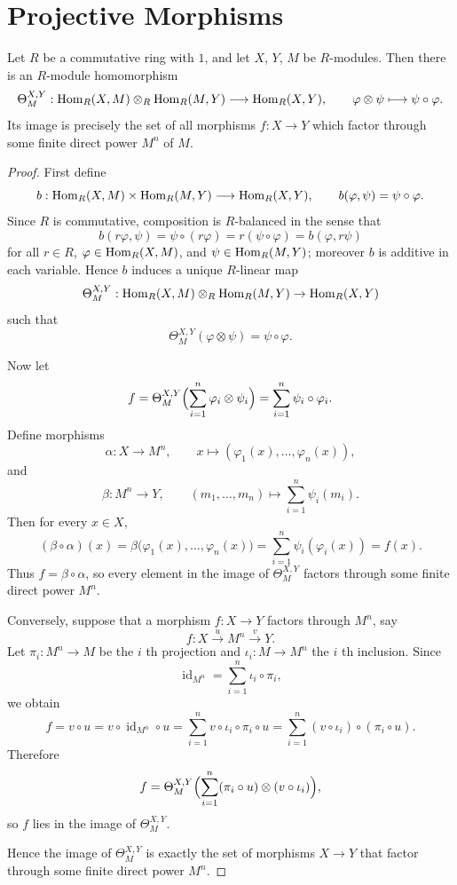 \section{Projective Morphisms}

\begin{lemma}
    Let $R$ be a commutative ring with $1$, and let $X$, $Y$, $M$ be $R$-modules. Then
    there is an $R$-module homomorphism
    \[
        \Theta_M^{X,Y}:\mathrm{Hom}_R(X,M)\otimes_R \mathrm{Hom}_R(M,Y)\longrightarrow \mathrm{Hom}_R(X,Y),
        \qquad
        \varphi\otimes \psi \longmapsto \psi\circ \varphi.
    \]
    Its image is precisely the set of all morphisms $f:X\to Y$ which factor through some
    finite direct power $M^n$ of $M$.
\end{lemma}

\begin{proof}
    First define
    \[
        b:\mathrm{Hom}_R(X,M)\times \mathrm{Hom}_R(M,Y)\longrightarrow \mathrm{Hom}_R(X,Y),
        \qquad
        b(\varphi,\psi)=\psi\circ\varphi.
    \]
    Since $R$ is commutative, composition is $R$-balanced in the sense that
    \[
        b(r\varphi,\psi)=\psi\circ(r\varphi)=r(\psi\circ\varphi)=b(\varphi,r\psi)
    \]
    for all $r\in R$, $\varphi\in\mathrm{Hom}_R(X,M)$, and $\psi\in\mathrm{Hom}_R(M,Y)$; moreover $b$ is additive in each variable. Hence $b$ induces a unique $R$-linear map
    \[
        \Theta_M^{X,Y}:\mathrm{Hom}_R(X,M)\otimes_R \mathrm{Hom}_R(M,Y)\to \mathrm{Hom}_R(X,Y)
    \]
    such that
    \[
        \Theta_M^{X,Y}(\varphi\otimes\psi)=\psi\circ\varphi.
    \]

    Now let
    \[
        f=\Theta_M^{X,Y}\Bigl(\sum_{i=1}^n \varphi_i\otimes\psi_i\Bigr)
        =\sum_{i=1}^n \psi_i\circ\varphi_i.
    \]
    Define morphisms
    \[
        \alpha:X\to M^n,\qquad x\longmapsto (\varphi_1(x),\dots,\varphi_n(x)),
    \]
    and
    \[
        \beta:M^n\to Y,\qquad (m_1,\dots,m_n)\longmapsto \sum_{i=1}^n \psi_i(m_i).
    \]
    Then for every $x\in X$,
    \[
        (\beta\circ\alpha)(x)
        =\beta\bigl(\varphi_1(x),\dots,\varphi_n(x)\bigr)
        =\sum_{i=1}^n \psi_i(\varphi_i(x))
        =f(x).
    \]
    Thus $f=\beta\circ\alpha$, so every element in the image of $\Theta_M^{X,Y}$ factors
    through some finite direct power $M^n$.

    Conversely, suppose that a morphism $f:X\to Y$ factors through $M^n$, say
    \[
        f:X\xrightarrow{\,u\,} M^n \xrightarrow{\,v\,} Y.
    \]
    Let $\pi_i:M^n\to M$ be the $i$ th projection and $\iota_i:M\to M^n$ the $i$ th inclusion.
    Since
    \[
        \operatorname{id}_{M^n}=\sum_{i=1}^n \iota_i\circ\pi_i,
    \]
    we obtain
    \[
        f=v\circ u
        =v\circ\operatorname{id}_{M^n}\circ u
        =\sum_{i=1}^n v\circ\iota_i\circ\pi_i\circ u
        =\sum_{i=1}^n (v\circ\iota_i)\circ(\pi_i\circ u).
    \]
    Therefore
    \[
        f
        =\Theta_M^{X,Y}\Bigl(\sum_{i=1}^n (\pi_i\circ u)\otimes (v\circ\iota_i)\Bigr),
    \]
    so $f$ lies in the image of $\Theta_M^{X,Y}$.

    Hence the image of $\Theta_M^{X,Y}$ is exactly the set of morphisms $X\to Y$ that
    factor through some finite direct power $M^n$.
\end{proof}

